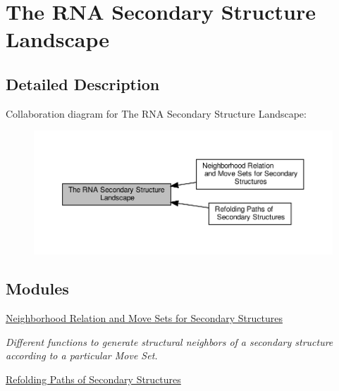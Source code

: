 \hypertarget{group__landscape}{}\section{The R\+NA Secondary Structure Landscape}
\label{group__landscape}


\subsection{Detailed Description}
Collaboration diagram for The R\+NA Secondary Structure Landscape\+:
\nopagebreak
\begin{figure}[H]
\begin{center}
\leavevmode
\includegraphics[width=350pt]{group__landscape}
\end{center}
\end{figure}
\subsection*{Modules}
\begin{DoxyCompactItemize}
\item 
\hyperlink{group__neighbors}{Neighborhood Relation and Move Sets for Secondary Structures}
\begin{DoxyCompactList}\small\item\em Different functions to generate structural neighbors of a secondary structure according to a particular Move Set. \end{DoxyCompactList}\item 
\hyperlink{group__paths}{Refolding Paths of Secondary Structures}
\end{DoxyCompactItemize}
